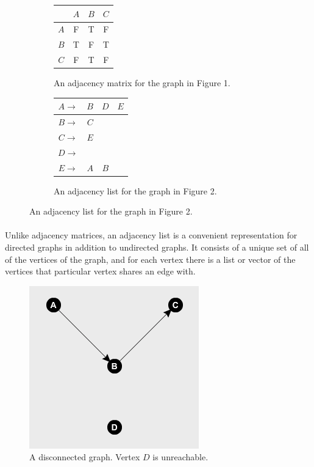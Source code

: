 \documentclass{article}
\begin{document}
\begin{figure}[H]
\centering
\begin{subfigure}{.45\textwidth}
    \centering
    \begin{tabular}{|c|c|c|c|}
        \hline
         \cellcolor{black} & $A$ & $B$ & $C$\\
        \hline\hline
        $A$ & F & T & F\\
        \hline
        $B$ & T & F & T\\
        \hline
        $C$ & F & T & F\\
        \hline
    \end{tabular}
    \caption{An adjacency matrix for the graph in Figure 1.}
\end{subfigure}
\begin{subfigure}{.45\textwidth}
    \centering
    \begin{tabular}{|c||c|c|c|}
        \hline
        $A\rightarrow$ & $B$ & $D$ & $E$\\
        \hline
        $B\rightarrow$ & $C$ & & \\
        \hline
        $C\rightarrow$ & $E$ & &\\
        \hline
        $D\rightarrow$ & & &\\
        \hline
        $E\rightarrow$ & $A$ & $B$ &\\
        \hline
    \end{tabular}
    \caption{An adjacency list for the graph in Figure 2.}
\end{subfigure}
\end{figure}

\paragraph{}
Unlike adjacency matrices, an adjacency list is a convenient representation for directed graphs in addition to undirected graphs. It consists of a unique set of all of the vertices of the graph, and for each vertex there is a list or vector of the vertices that particular vertex shares an edge with.

\begin{figure}[H]
    \centering
    \includegraphics[width=.5\linewidth, height=.3\textheight]{disconnected_graph}
    \caption{A disconnected graph. Vertex $D$ is unreachable.}
\end{figure}
\end{document}
